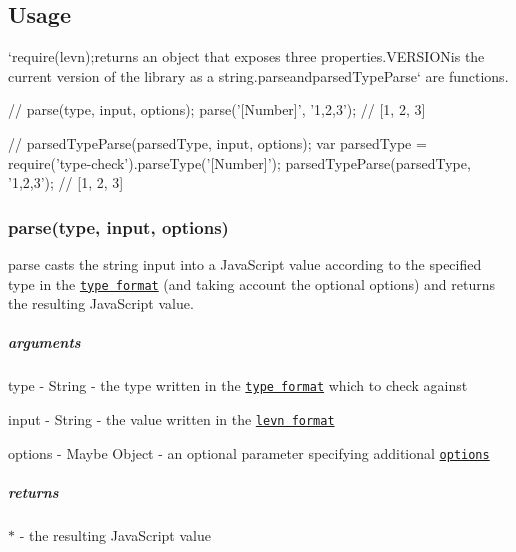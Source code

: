  \subsection*{Usage}

`require(\textquotesingle{}levn\textquotesingle{});{\ttfamily returns an object that exposes three properties.}V\+E\+R\+S\+I\+O\+N{\ttfamily is the current version of the library as a string.}parse{\ttfamily and}parsed\+Type\+Parse` are functions.


\begin{DoxyCode}
\textcolor{comment}{// parse(type, input, options);}
parse(\textcolor{stringliteral}{'[Number]'}, \textcolor{stringliteral}{'1,2,3'}); \textcolor{comment}{// [1, 2, 3]}

\textcolor{comment}{// parsedTypeParse(parsedType, input, options);}
var parsedType = require(\textcolor{stringliteral}{'type-check'}).parseType(\textcolor{stringliteral}{'[Number]'});
parsedTypeParse(parsedType, \textcolor{stringliteral}{'1,2,3'}); \textcolor{comment}{// [1, 2, 3]}
\end{DoxyCode}


\subsubsection*{parse(type, input, options)}

{\ttfamily parse} casts the string {\ttfamily input} into a Java\+Script value according to the specified {\ttfamily type} in the \href{https://github.com/gkz/type-check#type-format}{\tt type format} (and taking account the optional {\ttfamily options}) and returns the resulting Java\+Script value.

\subparagraph*{arguments}


\begin{DoxyItemize}
\item type -\/ {\ttfamily String} -\/ the type written in the \href{https://github.com/gkz/type-check#type-format}{\tt type format} which to check against
\item input -\/ {\ttfamily String} -\/ the value written in the \href{#levn-format}{\tt levn format}
\item options -\/ {\ttfamily Maybe Object} -\/ an optional parameter specifying additional \href{#options}{\tt options}
\end{DoxyItemize}

\subparagraph*{returns}

{\ttfamily $\ast$} -\/ the resulting Java\+Script value

